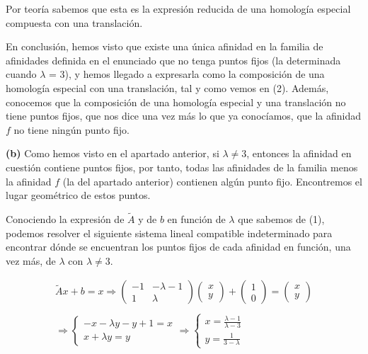 Por teoría sabemos que esta es la expresión reducida de una homología especial compuesta con una translación. 

En conclusión, hemos visto que existe una única afinidad en la familia de afinidades definida en el enunciado que no tenga puntos fijos (la determinada cuando $\lambda$ = 3), y hemos llegado a expresarla como la composición de una homología especial con una translación, tal y como vemos en (2). Además, conocemos que la composición de una homología especial y una translación no tiene puntos fijos, que nos dice una vez más lo que ya conocíamos, que la afinidad $f$ no tiene ningún punto fijo.

\pagebreak

\textbf{(b) } Como hemos visto en el apartado anterior, si $\lambda \neq 3$, entonces la afinidad en cuestión contiene puntos fijos, por tanto, todas las afinidades de la familia menos la afinidad $f$ (la del apartado anterior) contienen algún punto fijo. Encontremos el lugar geométrico de estos puntos.

Conociendo la expresión de $\widetilde{A}$ y de $b$ en función de $\lambda$ que sabemos de (1), podemos resolver el siguiente sistema lineal compatible indeterminado para encontrar dónde se encuentran los puntos fijos de cada afinidad en función, una vez más, de $\lambda$ con $\lambda \neq 3$.

\begin{gather*}
    \widetilde{A}x + b = x \Longrightarrow 
    \begin{pmatrix}
    -1 & -\lambda - 1\\
    1 & \lambda
    \end{pmatrix}
    \begin{pmatrix}
    x\\ y
    \end{pmatrix}
    +
    \begin{pmatrix}
    1\\ 0
    \end{pmatrix}
    = 
    \begin{pmatrix}
    x\\ y
    \end{pmatrix}
    \\
    \\
    \Longrightarrow
    \begin{cases}
    -x -\lambda y - y + 1 = x\\
    x + \lambda y = y
    \end{cases}
    \Longrightarrow
    \begin{cases}
    x = \frac{\lambda - 1}{\lambda - 3}\\
    y = \frac{1}{3 - \lambda}
    \end{cases}
\end{gather*}

